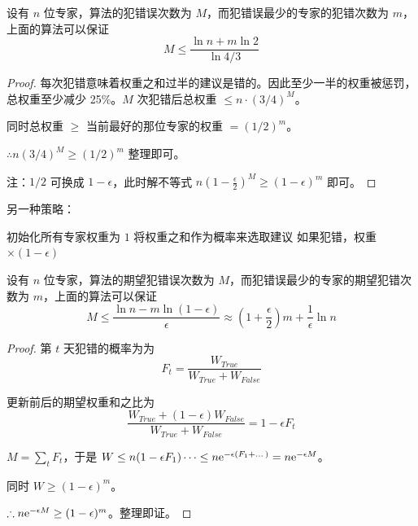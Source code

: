 \begin{theorem}
    设有 $n$ 位专家，算法的犯错误次数为 $M$，而犯错误最少的专家的犯错次数为 $m$，上面的算法可以保证
    \[
        M \le \frac{\ln n + m \ln 2}{\ln 4/3}
    \]
\end{theorem}

\begin{proof}
    每次犯错意味着权重之和过半的建议是错的。因此至少一半的权重被惩罚，总权重至少减少 25\%。$M$ 次犯错后总权重 $\le n \cdot (3/4)^M$。
    
    同时总权重 $\ge$ 当前最好的那位专家的权重 $= (1/2)^m$。
    
    $\therefore n(3/4)^M \ge (1/2)^m$ 整理即可。
    
    注：$1/2$ 可换成 $1-\epsilon$，此时解不等式 $n(1-\frac{\epsilon}{2})^M \ge (1-\epsilon)^m$ 即可。
\end{proof}

另一种策略：

\begin{algorithm}[h]
    \caption{randomized weighted majority 算法}
    \begin{algorithmic}[1]
        \State 初始化所有专家权重为 $1$
        \Loop
            \State 将权重之和作为概率来选取建议
            \State 如果犯错，权重 $\times (1 - \epsilon)$
        \EndLoop
    \end{algorithmic}
\end{algorithm}

\begin{theorem}
    设有 $n$ 位专家，算法的期望犯错误次数为 $M$，而犯错误最少的专家的期望犯错次数为 $m$，上面的算法可以保证
    \[
        M \le \frac{\ln n - m \ln(1-\epsilon)}{\epsilon} \approx (1+\frac{\epsilon}{2})m + \frac{1}{\epsilon} \ln n
    \]
\end{theorem}

\begin{proof}
    第 $t$ 天犯错的概率为为
    \[
        F_t = \frac{W_{True}}{W_{True} + W_{False}}
    \]
    
    更新前后的期望权重和之比为
    \[
        \frac{W_{True} + (1-\epsilon)W_{False}}{W_{True} + W_{False}} = 1 - \epsilon F_t
    \]
    
    $M = \sum_t F_t$，于是 $W \le n(1-\epsilon F_1) \dots \le n \mathrm{e}^{-\epsilon(F_1 + \dots)} = n \mathrm{e}^{-\epsilon M}$。
    
    同时 $W \ge (1-\epsilon)^m$。
    
    $\therefore n \mathrm{e}^{-\epsilon M} \ge (1-\epsilon)^m$。整理即证。
\end{proof}

